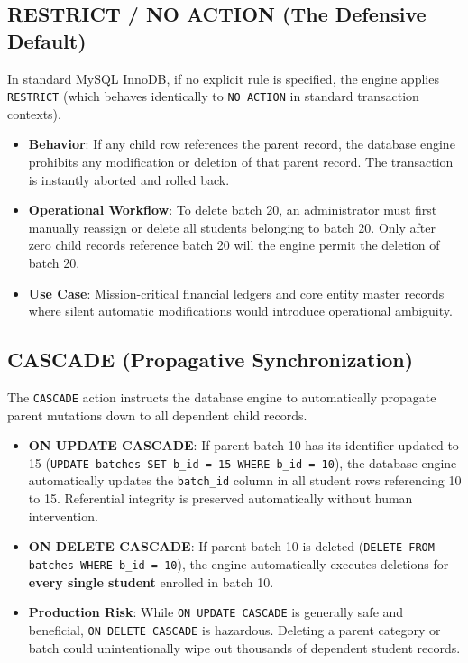 \documentclass[10pt,journal,compsoc,onecolumn]{IEEEtran}
\begin{document}
\subsection{RESTRICT / NO ACTION (The Defensive Default)}
In standard MySQL InnoDB, if no explicit rule is specified, the engine applies \texttt{RESTRICT} (which behaves identically to \texttt{NO ACTION} in standard transaction contexts).

\begin{itemize}
    \item \textbf{Behavior}: If any child row references the parent record, the database engine prohibits any modification or deletion of that parent record. The transaction is instantly aborted and rolled back.
    \item \textbf{Operational Workflow}: To delete batch 20, an administrator must first manually reassign or delete all students belonging to batch 20. Only after zero child records reference batch 20 will the engine permit the deletion of batch 20.
    \item \textbf{Use Case}: Mission-critical financial ledgers and core entity master records where silent automatic modifications would introduce operational ambiguity.
\end{itemize}

\subsection{CASCADE (Propagative Synchronization)}
The \texttt{CASCADE} action instructs the database engine to automatically propagate parent mutations down to all dependent child records.

\begin{itemize}
    \item \textbf{ON UPDATE CASCADE}: If parent batch 10 has its identifier updated to 15 (\texttt{UPDATE batches SET b\_id = 15 WHERE b\_id = 10}), the database engine automatically updates the \texttt{batch\_id} column in all student rows referencing 10 to 15. Referential integrity is preserved automatically without human intervention.
    \item \textbf{ON DELETE CASCADE}: If parent batch 10 is deleted (\texttt{DELETE FROM batches WHERE b\_id = 10}), the engine automatically executes deletions for \textbf{every single student} enrolled in batch 10.
    \item \textbf{Production Risk}: While \texttt{ON UPDATE CASCADE} is generally safe and beneficial, \texttt{ON DELETE CASCADE} is hazardous. Deleting a parent category or batch could unintentionally wipe out thousands of dependent student records.
\end{itemize}
\end{document}
